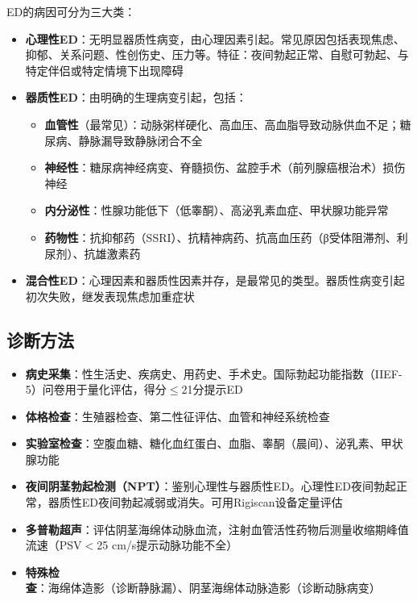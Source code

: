 ED的病因可分为三大类：

\begin{itemize}[leftmargin=2cm]
	\item \textbf{心理性ED}：无明显器质性病变，由心理因素引起。常见原因包括表现焦虑、抑郁、关系问题、性创伤史、压力等。特征：夜间勃起正常、自慰可勃起、与特定伴侣或特定情境下出现障碍
	\item \textbf{器质性ED}：由明确的生理病变引起，包括：
		\begin{itemize}
		\item \textbf{血管性}（最常见）：动脉粥样硬化、高血压、高血脂导致动脉供血不足；糖尿病、静脉漏导致静脉闭合不全
		\item \textbf{神经性}：糖尿病神经病变、脊髓损伤、盆腔手术（前列腺癌根治术）损伤神经
		\item \textbf{内分泌性}：性腺功能低下（低睾酮）、高泌乳素血症、甲状腺功能异常
		\item \textbf{药物性}：抗抑郁药（SSRI）、抗精神病药、抗高血压药（β受体阻滞剂、利尿剂）、抗雄激素药
		\end{itemize}
	\item \textbf{混合性ED}：心理因素和器质性因素并存，是最常见的类型。器质性病变引起初次失败，继发表现焦虑加重症状
\end{itemize}

\subsection{诊断方法}

\begin{itemize}[leftmargin=2cm]
	\item \textbf{病史采集}：性生活史、疾病史、用药史、手术史。国际勃起功能指数（IIEF-5）问卷用于量化评估，得分$\leq$21分提示ED
	\item \textbf{体格检查}：生殖器检查、第二性征评估、血管和神经系统检查
	\item \textbf{实验室检查}：空腹血糖、糖化血红蛋白、血脂、睾酮（晨间）、泌乳素、甲状腺功能
	\item \textbf{夜间阴茎勃起检测（NPT）}：鉴别心理性与器质性ED。心理性ED夜间勃起正常，器质性ED夜间勃起减弱或消失。可用Rigiscan设备定量评估
	\item \textbf{多普勒超声}：评估阴茎海绵体动脉血流，注射血管活性药物后测量收缩期峰值流速（PSV$<$25 cm/s提示动脉功能不全）
	\item \textbf{特殊检查}：海绵体造影（诊断静脉漏）、阴茎海绵体动脉造影（诊断动脉病变）
\end{itemize}

